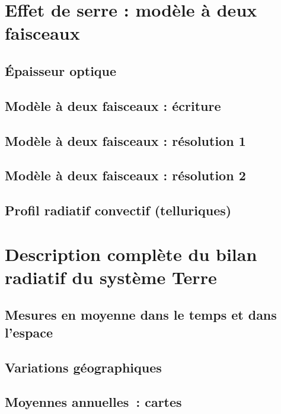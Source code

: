 \documentclass[a4paper,DIV16,10pt]{scrartcl}
\begin{document}
\mk \section{Effet de serre : modèle à deux faisceaux}
	\sk \subsection{\'Epaisseur optique}
		
	\sk \subsection{Modèle à deux faisceaux : écriture}
		
	\sk \subsection{Modèle à deux faisceaux : résolution 1}
		
	\sk \subsection{Modèle à deux faisceaux : résolution 2}
		
	\sk \subsection{Profil radiatif convectif (telluriques)}
		
%
%

\mk \section{Description complète du bilan radiatif du système Terre}
	\sk \subsection{Mesures en moyenne dans le temps et dans l'espace}
		
	\sk \subsection{Variations géographiques}
		
	\sk \subsection{Moyennes annuelles~: cartes}
		
\end{document}
